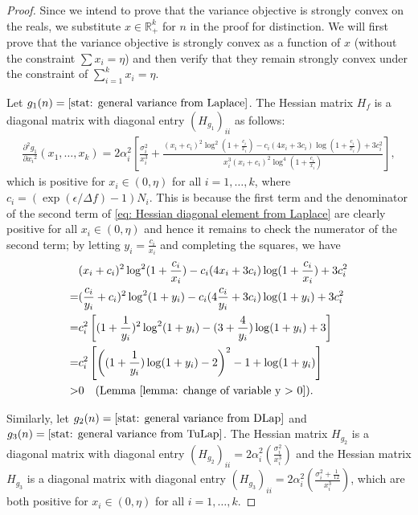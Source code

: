 \documentclass{article}
\theoremstyle{definition}
\begin{document}
\strongConvexity*

\begin{proof}
    Since we intend to prove that the variance objective is strongly convex on the reals, we substitute $x \in \mathbb{R}_+^k$ for $n$ in the proof for distinction. We will first prove that the variance objective is strongly convex as a function of $x$ (without the constraint $\sum x_i=\eta$) and then verify that they remain strongly convex under the constraint of $\sum_{i=1}^k x_i = \eta$.
    
    Let $g_1(n) = \eqref{stat: general variance from Laplace}$. The Hessian matrix $H_f$ is a diagonal matrix with diagonal entry $(H_{g_1})_{ii}$ as follows:
    \begin{align} \label{eq: Hessian diagonal element from Laplace}
        \frac{\partial^2 g_1}{\partial {x_i}^2} (x_1,\ldots,x_k) = 
        2 \alpha_i^2 \left[\frac{\sigma_i^2}{x_i^3} + \frac{(x_i+c_i)^2 \log^2(1+\frac{c_i}{x_i}) - c_i(4 x_i+3c_i) \log(1+\frac{c_i}{x_i}) + 3c_i^2}{x_i^3 (x_i+c_i)^2 \log^4 (1+\frac{c_i}{x_i})} \right],
    \end{align}
    which is positive for $x_i \in (0, \eta)$ for all $i=1,\ldots,k$, where $c_i = (\exp{(\epsilon / \Delta f)} - 1) N_i$. This is because the first term and the denominator of the second term of \eqref{eq: Hessian diagonal element from Laplace} are clearly positive for all $x_i \in (0, \eta)$ and hence it remains to check the numerator of the second term; by letting $y_i = \frac{c_i}{x_i}$ and completing the squares, we have
    \begin{align*}
        &(x_i+c_i)^2 \log^2(1+\frac{c_i}{x_i}) - c_i(4 x_i+3c_i) \log(1+\frac{c_i}{x_i}) + 3c_i^2 \\
        =& (\frac{c_i}{y_i} + c_i)^2 \log^2(1+y_i) - c_i (4 \frac{c_i}{y_i} + 3 c_i) \log(1 + y_i) + 3 c_i^2 \\
        =&c_i^2 \left[ (1+\frac{1}{y_i})^2 \log^2(1+y_i) - (3 + \frac{4}{y_i})  \log(1+y_i) + 3 \right] \\
        =& c_i^2 \left[ \left((1+\frac{1}{y_i}) \log(1+y_i) - 2\right)^2 - 1 + \log(1+y_i) \right] \\
        >& 0 \quad (\text{Lemma}~\ref{lemma: change of variable y > 0}).
    \end{align*}
    
    Similarly, let $g_2(n) = \eqref{stat: general variance from DLap}$ and $g_3(n) = \eqref{stat: general variance from TuLap}$. The Hessian matrix $H_{g_2}$ is a diagonal matrix with diagonal entry $(H_{g_2})_{ii} = 2 \alpha_i^2 \left(\frac{\sigma_i^2}{x_i^3} \right)$ and the Hessian matrix $H_{g_3}$ is a diagonal matrix with diagonal entry $(H_{g_3})_{ii} = 2 \alpha_i^2 \left(\frac{\sigma_i^2 + \frac{1}{12}}{x_i^3} \right)$, which are both positive  for $x_i \in (0, \eta)$ for all $i=1,\ldots,k$. 
    

\end{proof}
\end{document}
